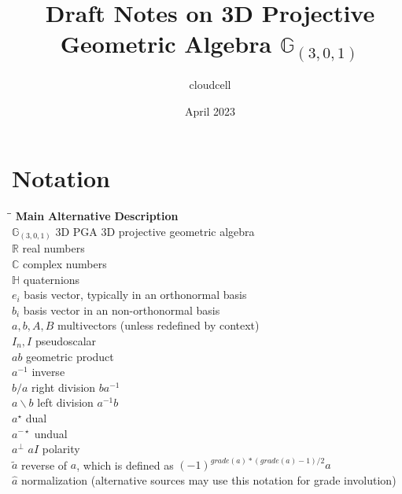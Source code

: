 \documentclass{article}
\title{Draft Notes on 3D Projective Geometric Algebra $\mathbb{G}_{(3,0,1)}$}
\author{cloudcell}
\date{April 2023}
\newcommand{\mycaption}[2][nolabel]{%
  \ifthenelse{\equal{#1}{label}}{\refstepcounter{table}\caption{#2}\label{table:\thetable}}{\caption*{#2}}%
}
\begin{document}
\maketitle  

\section{Notation}

\begin{tabbing}
    \hspace*{2cm}\=\hspace*{3cm}\=\kill
    \textbf{Main} \> \textbf{Alternative} \> \textbf{Description}\\
    $\mathbb{G}_{(3,0,1)}$ \> 3D PGA \> 3D projective geometric algebra\\
    $\mathbb{R}$ \> \> real numbers\\
    $\mathbb{C}$ \> \> complex numbers\\
    $\mathbb{H}$ \> \> quaternions\\
    $e_{i}$ \> \> basis vector, typically in an orthonormal basis\\
    $b_{i}$ \> \> basis vector in an non-orthonormal basis\\
    $a, b, A, B$ \> \> multivectors (unless redefined by context)\\
    $I_n, I$ \> \> pseudoscalar\\
    $ab$ \> \> geometric product\\
    $a^{-1}$ \> \> inverse\\
    $b / a$ \> \> right division $ba^{-1}$\\
    $a \backslash b$ \> \> left division $a^{-1}b$\\
    $a^{\star}$ \> \> dual\\
    $a^{-\star}$ \> \> undual\\
    $a^{\bot}$ \> $aI$ \> polarity\\
    $\tilde{a}$ \> \> reverse of $a$, which is defined as $(-1)^{grade(a)*(grade(a)-1)/2}a$ \\
    $\hat{a}$ \> \> normalization (alternative sources may use this notation for grade involution)\\

\end{tabbing}
\end{document}
